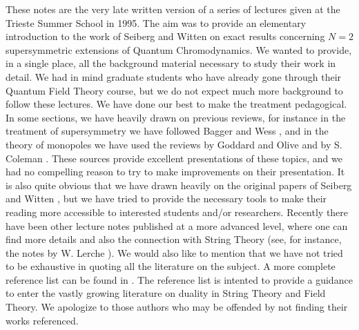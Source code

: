 
These notes are the very late written version of a series of lectures
given at the Trieste Summer School in 1995.  The aim was to provide an
elementary introduction to the work of Seiberg and Witten on exact
results concerning $N=2$ supersymmetric extensions of Quantum
Chromodynamics.  We wanted to provide, in a single place, all the
background material necessary to study their work in detail.  We had
in mind graduate students who have already gone through their Quantum
Field Theory course, but we do not expect much more background to
follow these lectures. We have done our best to make the treatment
pedagogical.  In some sections, we have heavily drawn on previous
reviews, for instance in the treatment of supersymmetry we have
followed Bagger and Wess \cite{WB}, and in the theory of monopoles we
have used the reviews by Goddard and Olive \cite{GO} and by S. Coleman
\cite{coleman1,coleman2}.  These sources provide excellent
presentations of these topics, and we had no compelling reason to try
to make improvements on their presentation.  It is also quite obvious
that we have drawn heavily on the original papers of Seiberg and
Witten \cite{SW-I,SW2}, but we have tried to provide the necessary
tools to make their reading more accessible to interested students
and/or researchers. Recently there have been other lecture notes
published at a more advanced level, where one can find more details
and also the connection with String Theory (see, for instance, the
notes by W. Lerche \cite{Lerche}).  We would also like to mention that
we have not tried to be exhaustive in quoting all the literature on
the subject.  A more complete reference list can be found in
\cite{Lerche}.  The reference list is intented to provide a guidance
to enter the vastly growing literature on duality in String Theory and
Field Theory.  We apologize to those authors who may be offended by
not finding their works referenced.


